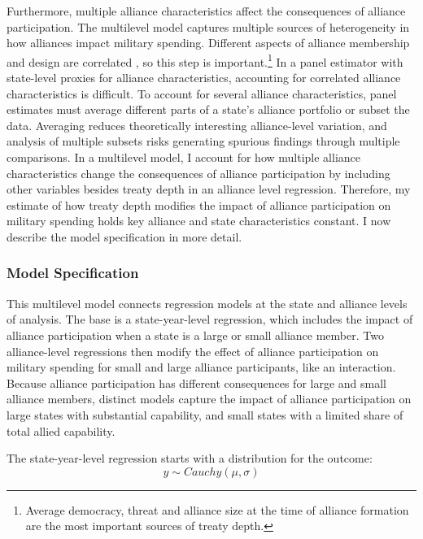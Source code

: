 \documentclass[12pt]{article}
\begin{document}
Furthermore, multiple alliance characteristics affect the consequences of alliance participation.
The multilevel model captures multiple sources of heterogeneity in how alliances impact military spending. 
Different aspects of alliance membership and design are correlated \citep{Chibaetal2015}, so this step is important.\footnote{Average democracy, threat and alliance size at the time of alliance formation are the most important sources of treaty depth.} 
In a panel estimator with state-level proxies for alliance characteristics, accounting for correlated alliance characteristics is difficult. 
To account for several alliance characteristics, panel estimates must average different parts of a state's alliance portfolio or subset the data.
Averaging reduces theoretically interesting alliance-level variation, and analysis of multiple subsets risks generating spurious findings through multiple comparisons.  
In a multilevel model, I account for how multiple alliance characteristics change the consequences of alliance participation by including other variables besides treaty depth in an alliance level regression. 
Therefore, my estimate of how treaty depth modifies the impact of alliance participation on military spending holds key alliance and state characteristics constant. 
I now describe the model specification in more detail. 
 


\subsubsection{Model Specification} 

This multilevel model connects regression models at the state and alliance levels of analysis. 
The base is a state-year-level regression, which includes the impact of alliance participation when a state is a large or small alliance member.
Two alliance-level regressions then modify the effect of alliance participation on military spending for small and large alliance participants, like an interaction. 
Because alliance participation has different consequences for large and small alliance members, distinct models capture the impact of alliance participation on large states with substantial capability, and small states with a limited share of total allied capability. 


The state-year-level regression starts with a distribution for the outcome:
\begin{equation}
y \sim Cauchy(\mu, \sigma)
\end{equation}
 
\end{document}
